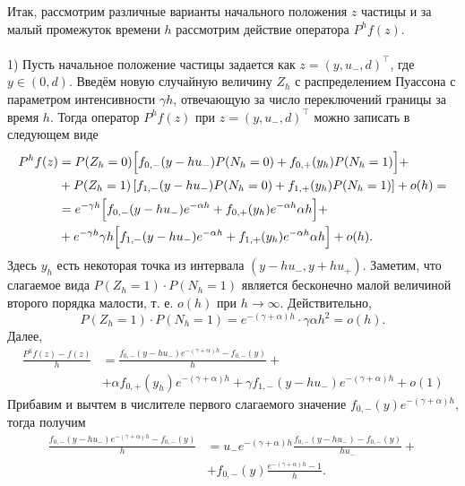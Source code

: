 \documentclass[12pt,a4paper]{article}
\begin{document}
Итак, рассмотрим различные варианты начального положения $z$ частицы и за малый промежуток времени $h$ рассмотрим действие оператора $P^h f (z)$.\\
\\
1) Пусть начальное положение частицы задается как  $z = \left(y, u_-, d\right)^\intercal$, где $y \in (0, d)$.
Введём новую случайную величину $Z_h$ с распределением Пуассона с параметром интенсивности $\gamma h$, отвечающую за число переключений границы за время $h$. Тогда оператор $P^h f (z)$ при $z = \left(y, u_-, d\right)^\intercal$ можно записать в следующем виде
\begin{equation*}
    \begin{aligned} 
  P^h f (z) &= P (Z_h = 0) \Bigl[f_{0, -} (y - h u_-) P (N_h = 0) + f_{0, +} (y_h) P(N_h = 1) \Bigr]  + \\
  & + P (Z_h = 1) \left[f_{1, -} (y - h u_-) P (N_h = 0) + f_{1, +} (y_h) P(N_h = 1) \right] + o (h) =\\
  & = e^{- \gamma h} \Bigl[f_{0,-} (y - h u_-) e^{- \alpha h} + f_{0, +} (y_h) e^{- \alpha h} \alpha h \Bigr] +\\
  & + e^{- \gamma h} \gamma h \Bigl[f_{1,-} (y - h u_-) e^{- \alpha h} + f_{1, +} (y_h) e^{- \alpha h} \alpha h \Bigr] + o(h).
\end{aligned}
\end{equation*}
Здесь $y_h$ есть некоторая точка из интервала $(y - h u_-, y + h u_+)$.
Заметим, что слагаемое вида  $P(Z_h = 1) \cdot P(N_h = 1)$ является бесконечно малой величиной второго порядка малости, т. е. $o(h)$ при $h \to \infty$. Действительно,
$$P(Z_h = 1) \cdot P(N_h = 1) = e^{- (\gamma + \alpha) h} \cdot \gamma \alpha h^2 = o(h).$$
Далее,
\begin{equation*}
    \begin{aligned}
  \frac{P^h f (z) - f(z)}{h} &= \frac{f_{0,-} (y - h u_-) e^{-(\gamma + \alpha) h} - f_{0,-} (y)}{h} + \\
  & + \alpha f_{0,+} (y_h) e^{- (\gamma + \alpha) h} + \gamma f_{1,-} (y - h u_-) e^{- (\gamma + \alpha) h} + o (1)  
    \end{aligned}
\end{equation*}
Прибавим и вычтем в числителе первого слагаемого значение $f_{0,-} (y) e^{- (\gamma + \alpha) h}$, тогда получим
\begin{equation*}
    \begin{aligned}
        \frac{f_{0,-} (y - h u_-) e^{-(\gamma + \alpha) h} - f_{0,-} (y)}{h} &= u_- e^{- (\gamma + \alpha) h} \frac{f_{0,-} (y - h u_-) - f_{0,-} (y)}{h u_-} + \\
& + f_{0,-} (y) \frac{e^{- (\gamma + \alpha) h} - 1}{h}.
    \end{aligned}
\end{equation*}
\end{document}
